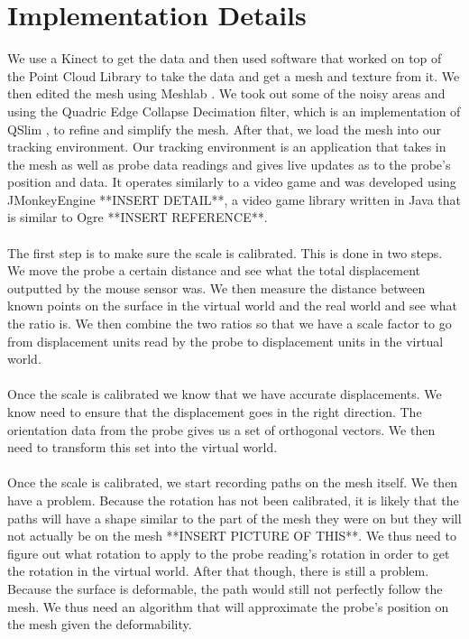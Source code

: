 \documentclass[11pt,psfig]{article}
\begin{document}
\section*{Implementation Details}

We use a Kinect to get the data and then used software that worked on top of the Point Cloud Library \cite{pointcloudlibrary} to take the data and get a mesh and texture from it. We then edited the mesh using Meshlab \cite{meshlab}. We took out some of the noisy areas and using the Quadric Edge Collapse Decimation filter, which is an implementation of QSlim \cite{qslim}, to refine and simplify the mesh. After that, we load the mesh into our tracking environment. Our tracking environment is an application that takes in the mesh as well as probe data readings and gives live updates as to the probe's position and data. It operates similarly to a video game and was developed using JMonkeyEngine **INSERT DETAIL**, a video game library written in Java that is similar to Ogre **INSERT REFERENCE**. \\
\\
The first step is to make sure the scale is calibrated. This is done in two steps. We move the probe a certain distance and see what the total displacement outputted by the mouse sensor was. We then measure the distance between known points on the surface in the virtual world and the real world and see what the ratio is. We then combine the two ratios so that we have a scale factor to go from displacement units read by the probe to displacement units in the virtual world. \\
\\
Once the scale is calibrated we know that we have accurate displacements. We know need to ensure that the displacement goes in the right direction. The orientation data from the probe gives us a set of orthogonal vectors. We then need to transform this set into the virtual world.\\
\\
Once the scale is calibrated, we start recording paths on the mesh itself. We then have a problem. Because the rotation has not been calibrated, it is likely that the paths will have a shape similar to the part of the mesh they were on but they will not actually be on the mesh **INSERT PICTURE OF THIS**. We thus need to figure out what rotation to apply to the probe reading's rotation in order to get the rotation in the virtual world. After that though, there is still a problem. Because the surface is deformable, the path would still not perfectly follow the mesh. We thus need an algorithm that will approximate the probe's position on the mesh given the deformability. \\
\end{document}
